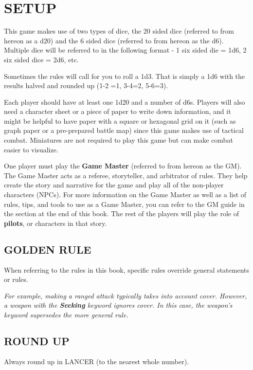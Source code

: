 \section{SETUP}

This game makes use of two types of dice, the 20 sided dice (referred to from hereon as a d20)
and the 6 sided dice (referred to from hereon as the d6). Multiple dice will be referred to in the
following format - 1 six sided die = 1d6, 2 six sided dice = 2d6, etc.

Sometimes the rules will call for you to roll a 1d3. That is simply a 1d6 with the results halved and
rounded up (1-2 =1, 3-4=2, 5-6=3).

Each player should have at least one 1d20 and a number of d6s. Players will also need a
character sheet or a piece of paper to write down information, and it might be helpful to have
paper with a square or hexagonal grid on it (such as graph paper or a pre-prepared battle map)
since this game makes use of tactical combat. Miniatures are not required to play this game but
can make combat easier to visualize.

One player must play the \textbf{Game Master} (referred to from hereon as the GM). The Game Master
acts as a referee, storyteller, and arbitrator of rules. They help create the story and narrative for
the game and play all of the non-player characters (NPCs). For more information on the Game
Master as well as a list of rules, tips, and tools to use as a Game Master, you can refer to the GM
guide in the section at the end of this book. The rest of the players will play the role of \textbf{pilots}, or
characters in that story.

\subsection{GOLDEN RULE}

When referring to the rules in this book, specific rules override general statements or rules.

\textit{For example, making a ranged attack typically takes into account cover. However, a weapon with
the \textbf{Seeking} keyword ignores cover. In this case, the weapon’s keyword supersedes the more
general rule.}

\subsection{ROUND UP}

Always round up in LANCER (to the nearest whole number).